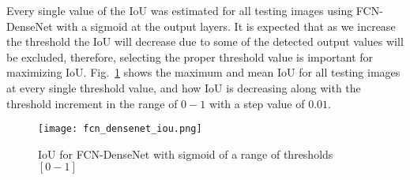 	Every single value of the IoU was estimated for all testing images using FCN-DenseNet with a sigmoid at the output layers.
	It is expected that as we increase the threshold the IoU will decrease due to some of the detected output values will be excluded, therefore, selecting the proper threshold value is important for maximizing IoU. Fig.~\ref{fig:iou_fcn} shows the maximum and mean IoU for all testing images at every single threshold value, and how IoU is decreasing along with the threshold increment in the range of \(0-1\) with a step value of \(0.01\).
	\begin{figure}[H] 
		\centering
		\texttt{[image: fcn\_densenet\_iou.png]}
		\centering
		\caption{IoU for FCN-DenseNet with sigmoid of a range of thresholds \([0-1]\)} 
		\label{fig:iou_fcn}
	\end{figure}
	
